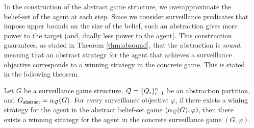 In the construction of the abstract  game structure, we overapproximate the belief-set of the agent at each step. Since we consider surveillance predicates that impose upper bounds on the size of the belief, such an abstraction  gives more power to the target (and, dually less power to the agent). This construction guarantees, as stated in Theorem \ref{thm:absound}, that the abstraction is \emph{sound}, meaning that an abstract strategy for the agent that achieves a surveillance objective corresponds to a winning strategy in the concrete game. This is stated in the following theorem.

\begin{theorem}\label{thm:absound}
Let $G$ be a surveillance game structure, $\mathcal{Q} = \{Q_i\}_{i=1}^n$ be an abstraction partition, and $G_{\mathsf{abstract}} = \alpha_{\mathcal{Q}}(G)$. For every surveillance objective $\varphi$, if there exists a wining strategy for the agent in the abstract belief-set game $(\alpha_{\mathcal{Q}}(G),\varphi)$, then there exists a winning strategy for the agent in the concrete surveillance game $(G,\varphi)$.
\end{theorem}

